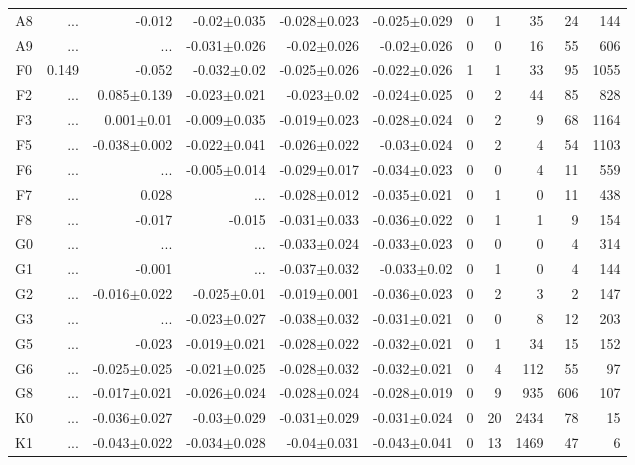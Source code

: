 \begin{table}[t]
\begin{table}[t]
\begin{center}
\begin{tabular}{c|rrrrr|rrrrr}
    A8	&	 ...	&	-0.012	&	-0.02$\pm$0.035	&	-0.028$\pm$0.023	&	-0.025$\pm$0.029	&	0	&	1	&	35	&	24	&	144	\\
    A9	&	 ...	&	 ...	&	-0.031$\pm$0.026	&	-0.02$\pm$0.026	&	-0.02$\pm$0.026	&	0	&	0	&	16	&	55	&	606	\\
    F0	&	0.149	&	-0.052	&	-0.032$\pm$0.02	&	-0.025$\pm$0.026	&	-0.022$\pm$0.026	&	1	&	1	&	33	&	95	&	1055	\\
    F2	&	 ...	&	0.085$\pm$0.139	&	-0.023$\pm$0.021	&	-0.023$\pm$0.02	&	-0.024$\pm$0.025	&	0	&	2	&	44	&	85	&	828	\\
    F3	&	 ...	&	0.001$\pm$0.01	&	-0.009$\pm$0.035	&	-0.019$\pm$0.023	&	-0.028$\pm$0.024	&	0	&	2	&	9	&	68	&	1164	\\
    F5	&	 ...	&	-0.038$\pm$0.002	&	-0.022$\pm$0.041	&	-0.026$\pm$0.022	&	-0.03$\pm$0.024	&	0	&	2	&	4	&	54	&	1103	\\
    F6	&	 ...	&	 ...	&	-0.005$\pm$0.014	&	-0.029$\pm$0.017	&	-0.034$\pm$0.023	&	0	&	0	&	4	&	11	&	559	\\
    F7	&	 ...	&	0.028	&	 ...	&	-0.028$\pm$0.012	&	-0.035$\pm$0.021	&	0	&	1	&	0	&	11	&	438	\\
    F8	&	 ...	&	-0.017	&	-0.015	&	-0.031$\pm$0.033	&	-0.036$\pm$0.022	&	0	&	1	&	1	&	9	&	154	\\
    G0	&	 ...	&	 ...	&	 ...	&	-0.033$\pm$0.024	&	-0.033$\pm$0.023	&	0	&	0	&	0	&	4	&	314	\\
    G1	&	 ...	&	-0.001	&	 ...	&	-0.037$\pm$0.032	&	-0.033$\pm$0.02	&	0	&	1	&	0	&	4	&	144	\\
    G2	&	 ...	&	-0.016$\pm$0.022	&	-0.025$\pm$0.01	&	-0.019$\pm$0.001	&	-0.036$\pm$0.023	&	0	&	2	&	3	&	2	&	147	\\
    G3	&	 ...	&	 ...	&	-0.023$\pm$0.027	&	-0.038$\pm$0.032	&	-0.031$\pm$0.021	&	0	&	0	&	8	&	12	&	203	\\
    G5	&	 ...	&	-0.023	&	-0.019$\pm$0.021	&	-0.028$\pm$0.022	&	-0.032$\pm$0.021	&	0	&	1	&	34	&	15	&	152	\\
    G6	&	 ...	&	-0.025$\pm$0.025	&	-0.021$\pm$0.025	&	-0.028$\pm$0.032	&	-0.032$\pm$0.021	&	0	&	4	&	112	&	55	&	97	\\
    G8	&	 ...	&	-0.017$\pm$0.021	&	-0.026$\pm$0.024	&	-0.028$\pm$0.024	&	-0.028$\pm$0.019	&	0	&	9	&	935	&	606	&	107	\\
    K0	&	 ...	&	-0.036$\pm$0.027	&	-0.03$\pm$0.029	&	-0.031$\pm$0.029	&	-0.031$\pm$0.024	&	0	&	20	&	2434	&	78	&	15	\\
    K1	&	 ...	&	-0.043$\pm$0.022	&	-0.034$\pm$0.028	&	-0.04$\pm$0.031	&	-0.043$\pm$0.041	&	0	&	13	&	1469	&	47	&	6	\\

\end{tabular}
\end{center}
\end{table}
\end{table}
